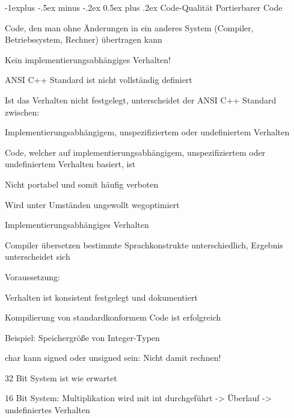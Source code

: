 \documentclass[a4paper]{article}
\makeatletter
\renewcommand{\subsection}{\@startsection{subsection}{2}{0mm}%
                                {-1explus -.5ex minus -.2ex}%
                                {0.5ex plus .2ex}%
                                {\normalfont\normalsize\bfseries}}
\makeatother
\begin{document}
\begin{multicols}{3}
  \subsection{Code-Qualität}
  Portierbarer Code
  \begin{itemize*}
    \item Code, den man ohne Änderungen in ein anderes System (Compiler, Betriebssystem, Rechner) übertragen kann
          \begin{itemize*}
            \item Kein implementierungsabhängiges Verhalten!
          \end{itemize*}
    \item ANSI C++ Standard ist nicht vollständig definiert
          \begin{itemize*}
            \item Ist das Verhalten nicht festgelegt, unterscheidet der ANSI C++ Standard zwischen:
            \item Implementierungsabhängigem, unspezifiziertem oder undefiniertem Verhalten
            \item Code, welcher auf implementierungsabhängigem, unspezifiziertem oder undefiniertem Verhalten basiert, ist
            \item Nicht portabel und somit häufig verboten
            \item Wird unter Umständen ungewollt wegoptimiert
          \end{itemize*}
  \end{itemize*}

  Implementierungsabhängiges Verhalten
  \begin{itemize*}
    \item Compiler übersetzen bestimmte Sprachkonstrukte unterschiedlich, Ergebnis unterscheidet sich
    \item Voraussetzung:
    \item Verhalten ist konsistent festgelegt und dokumentiert
    \item Kompilierung von standardkonformem Code ist erfolgreich
    \item Beispiel: Speichergröße von Integer-Typen
    \item char kann signed oder unsigned sein: Nicht damit rechnen!
    \item 32 Bit System ist wie erwartet
    \item 16 Bit System: Multiplikation wird mit int durchgeführt -> Überlauf -> undefiniertes Verhalten
  \end{itemize*}


\end{multicols}
\end{document}
